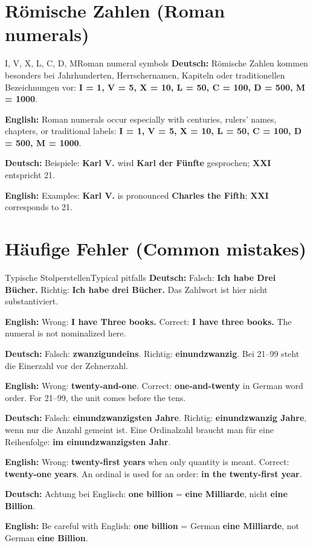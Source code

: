 \documentclass[a4paper,11pt]{article}
\newcommand{\GermanText}[1]{\textbf{Deutsch: }#1\par}
\newcommand{\EnglishText}[1]{{\small\color{SoftGray}\textbf{English: }#1\par}}
\begin{document}
\section{Römische Zahlen \textnormal{(Roman numerals)}}
\begin{grammarentry}{I, V, X, L, C, D, M}{Roman numeral symbols}
\GermanText{Römische Zahlen kommen besonders bei Jahrhunderten, Herrschernamen, Kapiteln oder traditionellen Bezeichnungen vor: \textbf{I = 1, V = 5, X = 10, L = 50, C = 100, D = 500, M = 1000}.}
\EnglishText{Roman numerals occur especially with centuries, rulers' names, chapters, or traditional labels: \textbf{I = 1, V = 5, X = 10, L = 50, C = 100, D = 500, M = 1000}.}
\GermanText{Beispiele: \textbf{Karl V.} wird \textbf{Karl der Fünfte} gesprochen; \textbf{XXI} entspricht 21.}
\EnglishText{Examples: \textbf{Karl V.} is pronounced \textbf{Charles the Fifth}; \textbf{XXI} corresponds to 21.}
\end{grammarentry}

\section{Häufige Fehler \textnormal{(Common mistakes)}}
\begin{grammarentry}{Typische Stolperstellen}{Typical pitfalls}
\GermanText{Falsch: \textbf{Ich habe Drei Bücher.} Richtig: \textbf{Ich habe drei Bücher.} Das Zahlwort ist hier nicht substantiviert.}
\EnglishText{Wrong: \textbf{I have Three books.} Correct: \textbf{I have three books.} The numeral is not nominalized here.}
\GermanText{Falsch: \textbf{zwanzigundeins}. Richtig: \textbf{einundzwanzig}. Bei 21--99 steht die Einerzahl vor der Zehnerzahl.}
\EnglishText{Wrong: \textbf{twenty-and-one}. Correct: \textbf{one-and-twenty} in German word order. For 21--99, the unit comes before the tens.}
\GermanText{Falsch: \textbf{einundzwanzigsten Jahre}. Richtig: \textbf{einundzwanzig Jahre}, wenn nur die Anzahl gemeint ist. Eine Ordinalzahl braucht man für eine Reihenfolge: \textbf{im einundzwanzigsten Jahr}.}
\EnglishText{Wrong: \textbf{twenty-first years} when only quantity is meant. Correct: \textbf{twenty-one years}. An ordinal is used for an order: \textbf{in the twenty-first year}.}
\GermanText{Achtung bei Englisch: \textbf{one billion} = \textbf{eine Milliarde}, nicht \textbf{eine Billion}.}
\EnglishText{Be careful with English: \textbf{one billion} = German \textbf{eine Milliarde}, not German \textbf{eine Billion}.}
\end{grammarentry}
\end{document}
